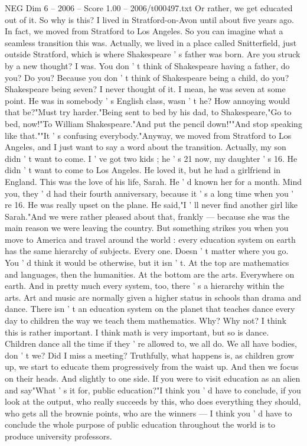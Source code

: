 \begin{textsample}{NEG Dim 6 – 2006 – Score 1.00 – 2006/t000497.txt}
Or rather, we get educated out of it.
So why is this?
I lived in Stratford-on-Avon until about five years ago.
In fact, we moved from Stratford to Los Angeles.
So you can imagine what a seamless transition this was.
Actually, we lived in a place called Snitterfield, just outside Stratford, which is where Shakespeare ' s father was born.
Are you struck by a new thought?
I was.
You don ' t think of Shakespeare having a father, do you?
Do you?
Because you don ' t think of Shakespeare being a child, do you?
Shakespeare being seven?
I never thought of it.
I mean, he was seven at some point.
He was in somebody ' s English class, wasn ' t he?
How annoying would that be?"Must try harder."Being sent to bed by his dad, to Shakespeare,"Go to bed, now!"To William Shakespeare."And put the pencil down!""And stop speaking like that.""It ' s confusing everybody."Anyway, we moved from Stratford to Los Angeles, and I just want to say a word about the transition.
Actually, my son didn ' t want to come.
I ' ve got two kids ; he ' s 21 now, my daughter ' s 16.
He didn ' t want to come to Los Angeles.
He loved it, but he had a girlfriend in England.
This was the love of his life, Sarah.
He ' d known her for a month.
Mind you, they ' d had their fourth anniversary, because it ' s a long time when you ' re 16.
He was really upset on the plane.
He said,"I ' ll never find another girl like Sarah."And we were rather pleased about that, frankly — because she was the main reason we were leaving the country.
But something strikes you when you move to America and travel around the world : every education system on earth has the same hierarchy of subjects.
Every one.
Doesn ' t matter where you go.
You ' d think it would be otherwise, but it isn ' t.
At the top are mathematics and languages, then the humanities.
At the bottom are the arts.
Everywhere on earth.
And in pretty much every system, too, there ' s a hierarchy within the arts.
Art and music are normally given a higher status in schools than drama and dance.
There isn ' t an education system on the planet that teaches dance every day to children the way we teach them mathematics.
Why?
Why not?
I think this is rather important.
I think math is very important, but so is dance.
Children dance all the time if they ' re allowed to, we all do.
We all have bodies, don ' t we?
Did I miss a meeting?
Truthfully, what happens is, as children grow up, we start to educate them progressively from the waist up.
And then we focus on their heads.
And slightly to one side.
If you were to visit education as an alien and say"What ' s it for, public education?"I think you ' d have to conclude, if you look at the output, who really succeeds by this, who does everything they should, who gets all the brownie points, who are the winners — I think you ' d have to conclude the whole purpose of public education throughout the world is to produce university professors.

\end{textsample}
